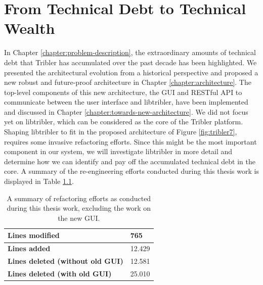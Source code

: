 \chapter{From Technical Debt to Technical Wealth}
\label{chapter:refactoring}
In Chapter \ref{chapter:problem-description}, the extraordinary amounts of technical debt that Tribler has accumulated over the past decade has been highlighted. We presented the architectural evolution from a historical perspective and proposed a new robust and future-proof architecture in Chapter \ref{chapter:architecture}. The top-level components of this new architecture, the GUI and RESTful API to communicate between the user interface and libtribler, have been implemented and discussed in Chapter \ref{chapter:towards-new-architecture}. We did not focus yet on libtribler, which can be considered as the core of the Tribler platform. Shaping libtribler to fit in the proposed architecture of Figure \ref{fig:tribler7}, requires some invasive refactoring efforts. Since this might be the most important component in our system, we will investigate libtribler in more detail and determine how we can identify and pay off the accumulated technical debt in the core. A summary of the re-engineering efforts conducted during this thesis work is displayed in Table \ref{table:refactoring-summary}.\\

\begin{table}[h!]
	\centering
	\begin{tabular}{|l|l|}
		\hline
		\textbf{Lines modified} & 765 \\ \hline
		\textbf{Lines added} & 12.429 \\ \hline
		\textbf{Lines deleted (without old GUI)} & 12.581 \\ \hline
		\textbf{Lines deleted (with old GUI)} & 25.010 \\ \hline
	\end{tabular}
	\caption{A summary of refactoring efforts as conducted during this thesis work, excluding the work on the new GUI.}
	\label{table:refactoring-summary}
\end{table}

